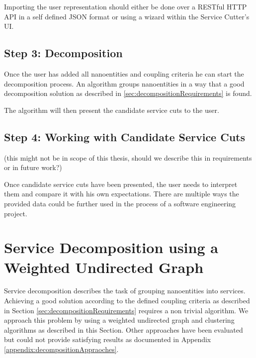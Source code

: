 Importing the user representation should either be done over a RESTful HTTP API in a self defined JSON format or using a wizard within the Service Cutter's \gls{UI}.

\subsection{Step 3: Decomposition}

Once the user has added all nanoentities and coupling criteria he can start the decomposition process. An algorithm groups nanoentities in a way that a good decomposition solution as described in \ref{sec:decompositionRequirements} is found. 

The algorithm will then present the candidate service cuts to the user.

\subsection{Step 4: Working with Candidate Service Cuts}

(this might not be in scope of this thesis, should we describe this in requirements or in future work?) %

Once candidate service cuts have been presented, the user needs to interpret them and compare it with his own expectations. There are multiple ways the provided data could be further used in the process of a software engineering project.


\section{Service Decomposition using a Weighted Undirected Graph}
\label{subsec:approach1_graph}

Service decomposition describes the task of grouping nanoentities into services. Achieving a good solution according to the defined coupling criteria as described in Section \ref{sec:decompositionRequirements} requires a non trivial algorithm. We approach this problem by using a weighted undirected graph and clustering algorithms as described in this Section. Other approaches have been evaluated but could not provide satisfying results as documented in Appendix \ref{appendix:decompositionAppraoches}.

